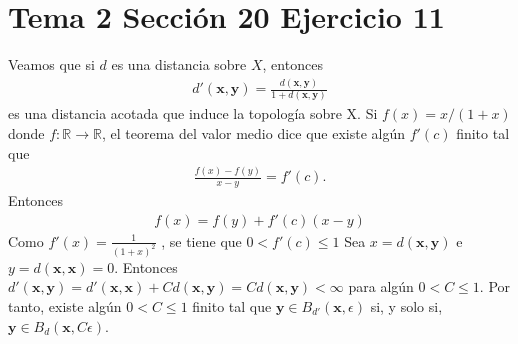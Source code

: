 \documentclass{article}
\newcommand{\vect}[1]{\boldsymbol{#1}}
\begin{document}
\section{Tema 2 Sección 20 Ejercicio 11}
Veamos que si $d$ es una distancia sobre $X$, entonces
\begin{eqnarray}
d'(\vect{x},\vect{y})=\frac{d(\vect{x},\vect{y})}{1+d(\vect{x},\vect{y})}\nonumber
\end{eqnarray}
es una distancia acotada que induce la topología sobre X.
Si $f(x)=x/(1+x)$ donde $f:\mathbb{R}\rightarrow \mathbb{R}$, el teorema del valor medio dice que existe algún $f'(c)$ finito tal que
\begin{eqnarray}
\frac{f(x)-f(y)}{x-y}=f'(c).
\end{eqnarray}
Entonces
\begin{eqnarray}
f(x)=f(y)+f'(c) (x-y)
\end{eqnarray}
Como $f'(x)=\frac{1}{(1+x)^2}$ , se tiene que $0<f'(c)\leq 1$ Sea $x=d(\vect{x},\vect{y})$ e $y=d(\vect{x},\vect{x})=0$. Entonces $d'(\vect{x},\vect{y})=d'(\vect{x},\vect{x})+Cd(\vect{x},\vect{y})=Cd(\vect{x},\vect{y})<\infty$ para algún $0<C\leq 1$. Por tanto, existe algún $0<C\leq 1$ finito tal que $\vect{y}\in B_{d'}(\vect{x},\epsilon)$ si, y solo si, $\vect{y}\in B_d(\vect{x},C\epsilon)$.
\end{document}
